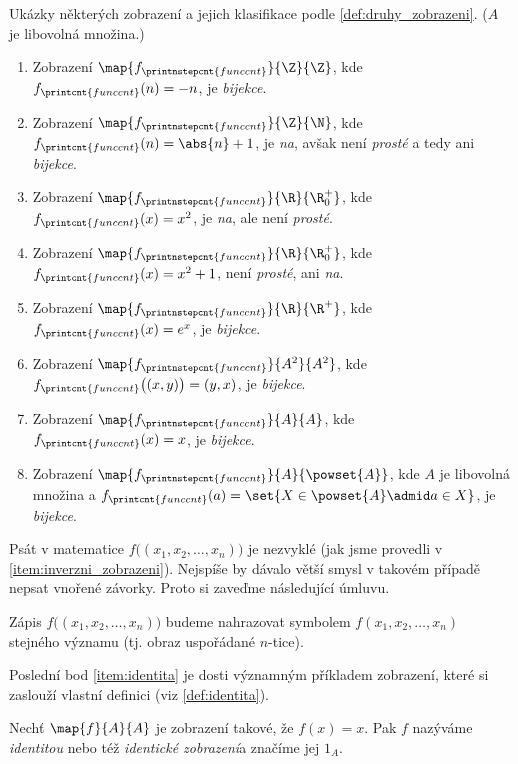 \begin{example}
    Ukázky některých zobrazení a jejich klasifikace podle \ref{def:druhy_zobrazeni}. ($A$ je libovolná množina.)
    \begin{enumerate}[label=(\roman*)]
        \item Zobrazení $\map{f_{\printnstepcnt{funccnt}}}{\Z}{\Z}$, kde $f_{\printcnt{funccnt}}(n)=-n$, je \emph{bijekce}.
        \item Zobrazení $\map{f_{\printnstepcnt{funccnt}}}{\Z}{\N}$, kde $f_{\printcnt{funccnt}}(n)=\abs{n}+1$, je \emph{na}, avšak není \emph{prosté} a tedy ani \emph{bijekce}.
        \item Zobrazení $\map{f_{\printnstepcnt{funccnt}}}{\R}{\R_0^+}$, kde $f_{\printcnt{funccnt}}(x)=x^2$, je \emph{na}, ale není \emph{prosté}.
        \item Zobrazení $\map{f_{\printnstepcnt{funccnt}}}{\R}{\R_0^+}$, kde $f_{\printcnt{funccnt}}(x)=x^2+1$, není \emph{prosté}, ani \emph{na}.
        \item Zobrazení $\map{f_{\printnstepcnt{funccnt}}}{\R}{\R^+}$, kde $f_{\printcnt{funccnt}}(x)=e^x$, je \emph{bijekce}.
        \item\label{item:inverzni_zobrazeni} Zobrazení $\map{f_{\printnstepcnt{funccnt}}}{A^2}{A^2}$, kde $f_{\printcnt{funccnt}}\big((x,y)\big)=(y,x)$, je \emph{bijekce}.
        \item\label{item:identita} Zobrazení $\map{f_{\printnstepcnt{funccnt}}}{A}{A}$, kde $f_{\printcnt{funccnt}}(x)=x$, je \emph{bijekce}.
        \item \sloppy Zobrazení $\map{f_{\printnstepcnt{funccnt}}}{A}{\powset{A}}$, kde $A$ je libovolná množina a $f_{\printcnt{funccnt}}(a)=\set{X\in\powset{A}\admid a\in X}$, je \emph{bijekce}.
    \end{enumerate}
\end{example}
Psát v matematice $f\big((x_1,x_2,\ldots,x_n)\big)$ je nezvyklé (jak jsme provedli v \ref{item:inverzni_zobrazeni}). Nejspíše by dávalo větší smysl v takovém případě nepsat vnořené závorky. Proto si zaveďme následující úmluvu.
\begin{convention}
    \sloppy Zápis $f\big((x_1,x_2,\ldots,x_n)\big)$ budeme nahrazovat symbolem $f(x_1,x_2,\ldots,x_n)$ stejného významu (tj. obraz uspořádané $n$-tice).
\end{convention}
Poslední bod \ref{item:identita} je dosti významným příkladem zobrazení, které si zaslouží vlastní definici (viz \ref{def:identita}).
\begin{definition}[Identita]\label{def:identita}
    Nechť $\map{f}{A}{A}$ je zobrazení takové, že $f(x)=x$. Pak $f$ nazýváme \emph{identitou} nebo též \emph{identické zobrazení}a značíme jej $1_A$.
\end{definition}
